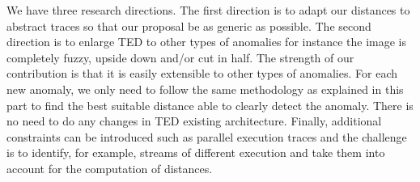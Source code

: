 We have three research directions. The first direction is to adapt our distances to abstract traces so that our proposal be as generic as possible. 
The second direction is to enlarge TED to other types of anomalies for instance the image is completely fuzzy, upside down and/or cut in half. 
The strength of our contribution is that it is easily extensible  to other types of anomalies. For each new anomaly, we only need to follow the 
same methodology as explained in this part to find the best suitable distance able to clearly detect the anomaly. There is no need to do any changes
 in TED existing architecture.  Finally, additional constraints can be introduced such as parallel execution traces and 
the challenge is to identify, for example, streams of different execution and take them into account for the computation of distances.



